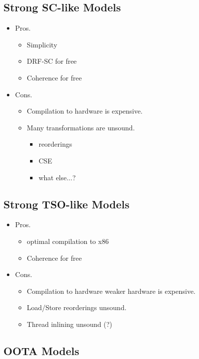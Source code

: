 \subsection{Strong SC-like Models}

\begin{itemize}
  \item Pros.
  \begin{itemize}
    \item Simplicity
    \item DRF-SC for free
    \item Coherence for free
  \end{itemize}
  \item Cons.
  \begin{itemize}
    \item Compilation to hardware is expensive.
    \item Many transformations are unsound.
    \begin{itemize}
      \item reorderings
      \item CSE
      \item what else...?
    \end{itemize}
  \end{itemize}
\end{itemize}

\subsection{Strong TSO-like Models}

\begin{itemize}
  \item Pros.
  \begin{itemize}
    \item optimal compilation to x86
    \item Coherence for free
  \end{itemize}
  \item Cons.
  \begin{itemize}
    \item Compilation to hardware weaker hardware is expensive.
    \item Load/Store reorderings unsound.
    \item Thread inlining unsound (?)
  \end{itemize}
\end{itemize}

\subsection{OOTA Models}

